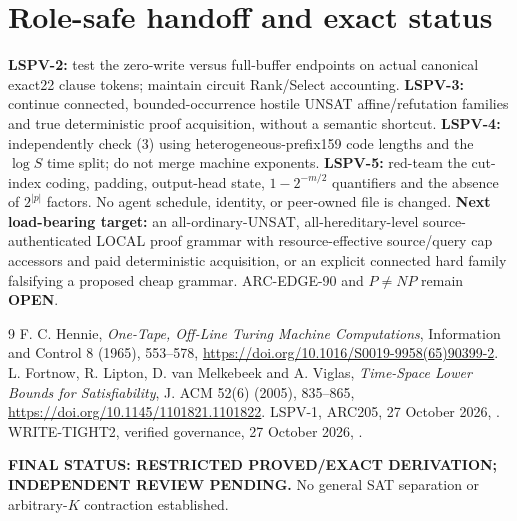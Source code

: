 \documentclass[11pt]{article}
\newcommand{\OPEN}{\textbf{OPEN}}
\begin{document}
\section{Role-safe handoff and exact status}
\noindent\textbf{LSPV-2:} test the zero-write versus
full-buffer endpoints on actual canonical exact22
clause tokens; maintain circuit Rank/Select accounting.
\textbf{LSPV-3:} continue connected, bounded-occurrence
hostile UNSAT affine/refutation families and true
deterministic proof acquisition, without a semantic shortcut.
\textbf{LSPV-4:} independently check (3) using
heterogeneous-prefix159 code lengths and the
$\log S$ time split; do not merge machine exponents.
\textbf{LSPV-5:} red-team the cut-index coding,
padding, output-head state, $1-2^{-m/2}$ quantifiers
and the absence of $2^{|p|}$ factors.
No agent schedule, identity, or peer-owned file is changed.
\noindent\textbf{Next load-bearing target:}
an all-ordinary-UNSAT, all-hereditary-level
source-authenticated LOCAL proof grammar with
resource-effective source/query cap accessors and paid
deterministic acquisition, or an explicit connected hard
family falsifying a proposed cheap grammar.
ARC-EDGE-90 and $P\ne NP$ remain \OPEN.

\begin{thebibliography}{9}
F. C. Hennie, \emph{One-Tape, Off-Line Turing Machine
Computations}, Information and Control 8 (1965), 553--578,
\url{https://doi.org/10.1016/S0019-9958(65)90399-2}.
L. Fortnow, R. Lipton, D. van Melkebeek and A. Viglas,
\emph{Time-Space Lower Bounds for Satisfiability},
J. ACM 52(6) (2005), 835--865,
\url{https://doi.org/10.1145/1101821.1101822}.
LSPV-1, ARC205, 27 October 2026,
.
WRITE-TIGHT2, verified governance, 27 October 2026,
.
\end{thebibliography}
\noindent\textbf{FINAL STATUS: RESTRICTED PROVED/EXACT DERIVATION;
INDEPENDENT REVIEW PENDING.}
No general SAT separation or arbitrary-$K$ contraction established.
\end{document}
